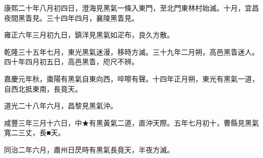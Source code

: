 \begin{pinyinscope}
康熙二十年八月初四日，澄海見黑氣一條入東門，至北門東林村始滅。十月，宜昌夜間黑眚見。三十四年四月，襄陵黑眚見。

雍正六年三月初九日，鎮洋見黑氣如疋布，良久方散。

乾隆三十五年七月，東光黑氣迷漫，移時方滅。三十九年二月朔，高邑黑眚迷人。四十年四月初五日，高邑黑眚，咫尺不辨。

嘉慶元年秋，棗陽有黑氣自東向西，啐嚓有聲。十四年正月朔，東光有黑氣一道，自西北抵東南，長竟天。

道光二十八年六月，昌黎見黑氣沖。

咸豐三年三月十六日，中★有黑黃氣二道，直沖天際。五年七月初十，曹縣見黑氣寬二三丈，長■天。

同治二年六月，肅州日昃時有黑氣長竟天，半夜方滅。


\end{pinyinscope}